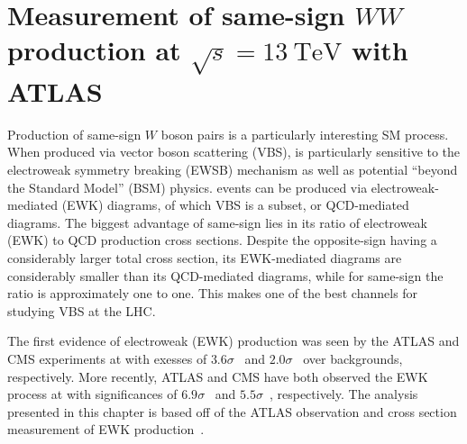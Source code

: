\chapter[Measurement of same-sign $WW$ production at $\sqrt{s} = 13~\mathrm{TeV}$ with ATLAS][Measurement of same-sign $WW$ production at $\sqrt{s} = 13~\mathrm{TeV}$ with ATLAS]{Measurement of same-sign $WW$ production at $\sqrt{s} = 13~\mathrm{TeV}$ with ATLAS}
\label{ch:ssww13tev}
\setcounter{subsection}{0}

Production of same-sign $W$ boson pairs is a particularly interesting SM process.
When produced via vector boson scattering (VBS), \ssww is particularly sensitive to the electroweak symmetry breaking (EWSB) mechanism as well as potential ``beyond the Standard Model'' (BSM) physics.
\ssww events can be produced via electroweak-mediated (EWK) diagrams, of which VBS is a subset, or QCD-mediated diagrams. 
The biggest advantage of same-sign \ssww lies in its ratio of electroweak (EWK) to QCD production cross sections.
Despite the opposite-sign \osww having a considerably larger total cross section, its EWK-mediated diagrams are considerably smaller than its QCD-mediated diagrams, while for same-sign \sswwnojj the ratio is approximately one to one.
This makes \ssww one of the best channels for studying VBS at the LHC.

The first evidence of electroweak (EWK) \ssww production was seen by the ATLAS and CMS experiments at  with exesses of $3.6\sigma$~\cite{2014.ssww-8tev-atlas} and $2.0\sigma$~\cite{2015-ssww-8tev-cms} over backgrounds, respectively.
More recently, ATLAS and CMS have both observed the EWK process at  with significances of $6.9\sigma$~\cite{2018.ssww-13tev-atlas-conf} and $5.5\sigma$~\cite{2017.ssww-13tev-cms}, respectively.
The analysis presented in this chapter is based off of the ATLAS  observation and cross section measurement of EWK \ssww production~\cite{2018.ssww-13tev-atlas-conf, 2018.ssww-13tev-atlas-support}.



